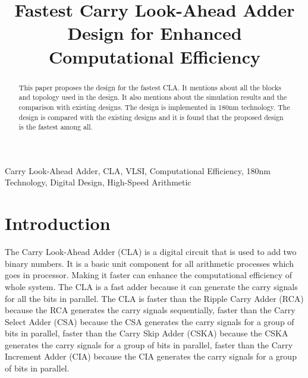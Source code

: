 \documentclass[conference]{IEEEtran}
\begin{document}
\title{Fastest Carry Look-Ahead Adder Design for Enhanced Computational Efficiency\\
}

\author{
}

\maketitle

\begin{abstract}
This paper proposes the design for the fastest CLA. It mentions about all the blocks and topology used in the design. It also mentions about the simulation results and the comparison with existing designs. The design is implemented in 180nm technology. The design is compared with the existing designs and it is found that the proposed design is the fastest among all.
\end{abstract}
\begin{IEEEkeywords}
Carry Look-Ahead Adder, CLA, VLSI, Computational Efficiency, 180nm Technology, Digital Design, High-Speed Arithmetic
\end{IEEEkeywords}

\section{Introduction}
The Carry Look-Ahead Adder (CLA) is a digital circuit that is used to add two binary numbers. It is a basic unit component for all arithmetic processes which goes in processor. Making it faster can enhance the computational efficiency of whole system. The CLA is a fast adder because it can generate the carry signals for all the bits in parallel. The CLA is faster than the Ripple Carry Adder (RCA) because the RCA generates the carry signals sequentially, faster than the Carry Select Adder (CSA) because the CSA generates the carry signals for a group of bits in parallel, faster than the Carry Skip Adder (CSKA) because the CSKA generates the carry signals for a group of bits in parallel, faster than the Carry Increment Adder (CIA) because the CIA generates the carry signals for a group of bits in parallel.
\end{document}

